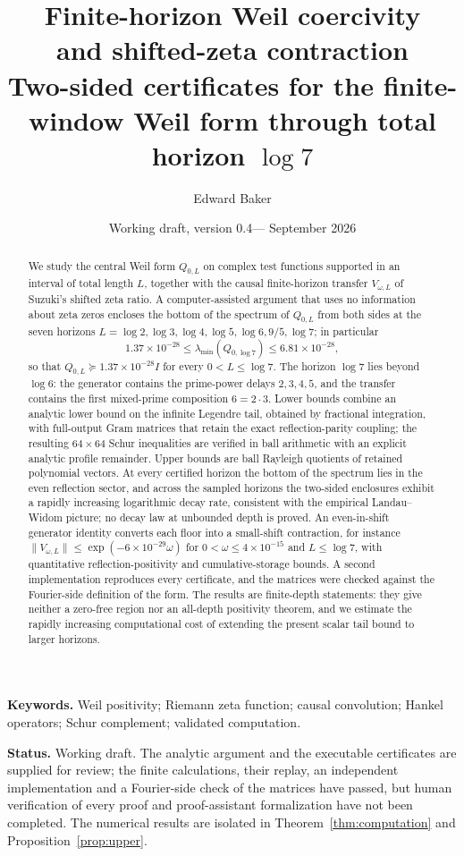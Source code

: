 \documentclass[11pt]{article}
\title{Finite-horizon Weil coercivity\protect\\ and shifted-zeta contraction\protect\\[5pt]
\large Two-sided certificates for the finite-window Weil form through total horizon $\log 7$}
\author{Edward Baker}
\date{Working draft, version 0.4\quad---\quad 10 September 2026}
\numberwithin{equation}{section}
\theoremstyle{definition}
\theoremstyle{remark}
\newcommand{\norm}[1]{\lVert#1\rVert}
\begin{document}
\maketitle
\begin{abstract}
We study the central Weil form $Q_{0,L}$ on complex test functions supported
in an interval of total length $L$, together with the causal finite-horizon
transfer $V_{\omega,L}$ of Suzuki's shifted zeta ratio. A computer-assisted
argument that uses no information about zeta zeros encloses the bottom of the
spectrum of $Q_{0,L}$ from both sides at the seven horizons
$L=\log2,\log3,\log4,\log5,\log6,9/5,\log7$; in particular
\[
 1.37\times10^{-28}\le\lambda_{\min}(Q_{0,\log7})\le6.81\times10^{-28},
\]
so that $Q_{0,L}\succeq1.37\times10^{-28}I$ for every $0<L\le\log7$. The
horizon $\log7$ lies beyond $\log6$: the generator contains the prime-power
delays $2,3,4,5$, and the transfer contains the first mixed-prime composition
$6=2\cdot3$. Lower bounds combine an analytic lower bound on the infinite
Legendre tail, obtained by fractional integration, with full-output Gram
matrices that retain the exact reflection-parity coupling; the resulting
$64\times64$ Schur inequalities are verified in ball arithmetic with an
explicit analytic profile remainder. Upper bounds are ball Rayleigh quotients
of retained polynomial vectors. At every certified horizon the bottom of the
spectrum lies in the even reflection sector, and across the sampled horizons
the two-sided enclosures exhibit a rapidly increasing logarithmic decay rate,
consistent with the empirical Landau--Widom picture; no decay law at unbounded
depth is proved. An even-in-shift generator identity converts each floor into
a small-shift contraction, for instance
$\norm{V_{\omega,L}}\le\exp(-6\times10^{-29}\omega)$ for
$0<\omega\le4\times10^{-15}$ and $L\le\log7$, with quantitative
reflection-positivity and cumulative-storage bounds. A second implementation
reproduces every certificate, and the matrices were checked against the
Fourier-side definition of the form. The results are finite-depth statements:
they give neither a zero-free region nor an all-depth positivity theorem, and
we estimate the rapidly increasing computational cost of extending the present
scalar tail bound to larger horizons.
\end{abstract}

\noindent\textbf{Keywords.} Weil positivity; Riemann zeta function; causal
convolution; Hankel operators; Schur complement; validated computation.

\smallskip
\noindent\textbf{Status.} Working draft. The analytic argument and the
executable certificates are supplied for review; the finite calculations,
their replay, an independent implementation and a Fourier-side check of the
matrices have passed, but human verification of every proof and proof-assistant
formalization have not been completed. The numerical results are isolated in
Theorem~\ref{thm:computation} and Proposition~\ref{prop:upper}.
\end{document}
